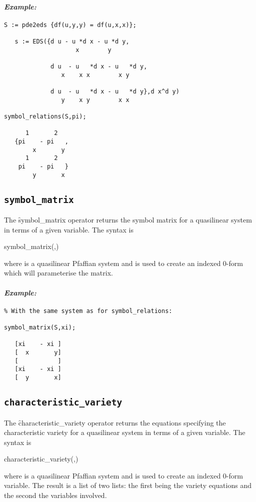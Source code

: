 \paragraph{\it Example:}
\begin{verbatim}
S := pde2eds {df(u,y,y) = df(u,x,x)};

   s := EDS({d u - u *d x - u *d y,
                    x        y
   
             d u  - u   *d x - u   *d y,
                x    x x        x y

             d u  - u   *d x - u   *d y},d x^d y)
                y    x y        x x

symbol_relations(S,pi);

      1       2 
   {pi    - pi   ,
        x       y 
      1       2 
    pi    - pi   }
        y       x 
\end{verbatim}

\subsection{\tt symbol\_matrix}
\label{symbol_matrix}

The \f{symbol\_matrix} operator returns the symbol matrix for a quasilinear
system in terms of a given variable. The syntax is
\begin{syntax}
	symbol\_matrix(,)
\end{syntax}
where  is a quasilinear Pfaffian system and  is
used to create an indexed 0-form which will parameterise the matrix.

\paragraph{\it Example:}
\begin{verbatim}
% With the same system as for symbol_relations:

symbol_matrix(S,xi);

   [xi    - xi ]
   [  x       y]
   [           ]
   [xi    - xi ]
   [  y       x]
\end{verbatim}

\subsection{\tt characteristic\_variety}
\label{characteristic_variety}

The \f{characteristic\_variety} operator returns the equations specifying
the characteristic variety for a quasilinear
system in terms of a given variable. The syntax is
\begin{syntax}
	characteristic\_variety(,)
\end{syntax}
where  is a quasilinear Pfaffian system and  is
used to create an indexed 0-form variable. The result is a list of two
lists: the first being the variety equations and the second the variables
involved.

